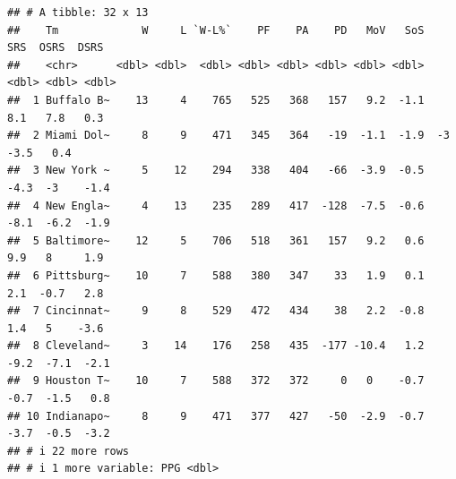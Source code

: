 \documentclass[
]{article}
\newenvironment{Shaded}{\begin{snugshade}}{\end{snugshade}}
\newcommand{\NormalTok}[1]{#1}
\newcommand{\OtherTok}[1]{\textcolor[rgb]{0.56,0.35,0.01}{#1}}
\newcommand{\SpecialCharTok}[1]{\textcolor[rgb]{0.81,0.36,0.00}{\textbf{#1}}}
\newcommand{\StringTok}[1]{\textcolor[rgb]{0.31,0.60,0.02}{#1}}
\begin{document}
\begin{Shaded}
\end{Shaded}

\begin{verbatim}
## # A tibble: 32 x 13
##    Tm             W     L `W-L%`    PF    PA    PD   MoV   SoS   SRS  OSRS  DSRS
##    <chr>      <dbl> <dbl>  <dbl> <dbl> <dbl> <dbl> <dbl> <dbl> <dbl> <dbl> <dbl>
##  1 Buffalo B~    13     4    765   525   368   157   9.2  -1.1   8.1   7.8   0.3
##  2 Miami Dol~     8     9    471   345   364   -19  -1.1  -1.9  -3    -3.5   0.4
##  3 New York ~     5    12    294   338   404   -66  -3.9  -0.5  -4.3  -3    -1.4
##  4 New Engla~     4    13    235   289   417  -128  -7.5  -0.6  -8.1  -6.2  -1.9
##  5 Baltimore~    12     5    706   518   361   157   9.2   0.6   9.9   8     1.9
##  6 Pittsburg~    10     7    588   380   347    33   1.9   0.1   2.1  -0.7   2.8
##  7 Cincinnat~     9     8    529   472   434    38   2.2  -0.8   1.4   5    -3.6
##  8 Cleveland~     3    14    176   258   435  -177 -10.4   1.2  -9.2  -7.1  -2.1
##  9 Houston T~    10     7    588   372   372     0   0    -0.7  -0.7  -1.5   0.8
## 10 Indianapo~     8     9    471   377   427   -50  -2.9  -0.7  -3.7  -0.5  -3.2
## # i 22 more rows
## # i 1 more variable: PPG <dbl>
\end{verbatim}
\end{document}
